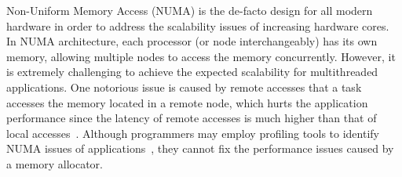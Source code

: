 Non-Uniform Memory Access (NUMA) is the de-facto design for all modern hardware in order to address the scalability issues of increasing hardware cores. In NUMA architecture, each processor (or node interchangeably) has its own memory, allowing multiple nodes to access the memory concurrently. However, it is extremely challenging to achieve the expected scalability for multithreaded applications. One notorious issue is caused by remote accesses that a task accesses the memory located in a remote node, which hurts the application performance since the latency of remote accesses is much higher than that of local accesses~\cite{Blagodurov:2011:CNC:2002181.2002182}. 
Although programmers may employ profiling tools to identify NUMA issues of applications~\cite{Intel:VTune, Memphis, Lachaize:2012:MMP:2342821.2342826, XuNuma, NumaMMA, 7847070, NumaPerf}, they cannot fix the performance issues caused by a memory allocator.


